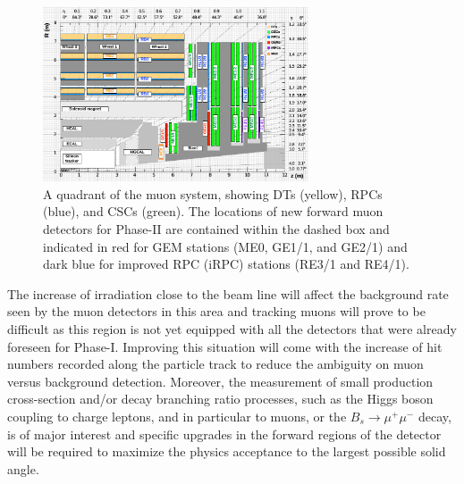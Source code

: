 	\begin{figure}[H]
		\centering
		\includegraphics[width=0.7\textwidth]{fig/chapt3/Phase2_Muon_quadrant.pdf}
		\caption{\label{fig:P2Quadrant} A quadrant of the muon system, showing DTs (yellow), RPCs (blue), and CSCs (green). The locations of new forward muon detectors for Phase-II are contained within the dashed box and indicated in red for GEM stations (ME0, GE1/1, and GE2/1) and dark blue for improved RPC (iRPC) stations (RE3/1 and RE4/1).}
	\end{figure}

	The increase of irradiation close to the beam line will affect the background rate seen by the muon detectors in this area and tracking muons will prove to be difficult as this region is not yet equipped with all the detectors that were already foreseen for Phase-I. Improving this situation will come with the increase of hit numbers recorded along the particle track to reduce the ambiguity on muon versus background detection. Moreover, the measurement of small production cross-section and/or decay branching ratio processes, such as the Higgs boson coupling to charge leptons, and in particular to muons, or the $B_s \longrightarrow \mu^+\mu^-$ decay, is of major interest and specific upgrades in the forward regions of the detector will be required to maximize the physics acceptance to the largest possible solid angle.
	

